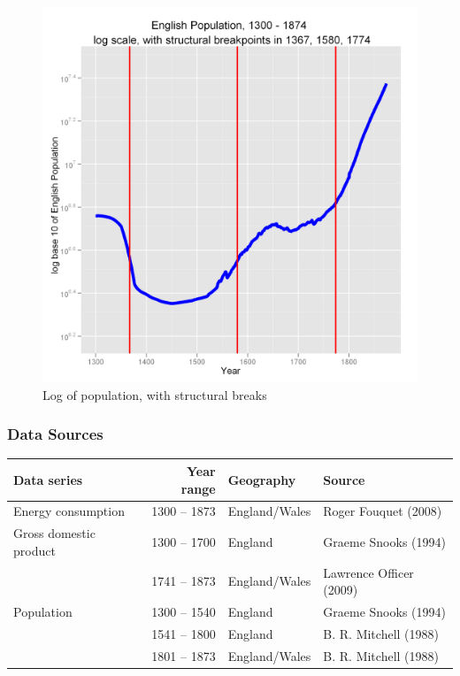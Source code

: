 \documentclass[final]{beamer}
\begin{document}
\begin{frame}
\begin{figure}[p!]
\center
\caption{Log of population, with structural breaks}
\label{fig:popLog}
\includegraphics[height=0.8\textheight]{popLog}
\end{figure}
\end{frame}

\begin{frame}
\frametitle{Data Sources}
\footnotesize{
\begin{table}[p!]
\label{tbl:dataSources}
\begin{tabular}{lrll}
Data series&Year range&Geography&Source\\
\hline
Energy consumption&1300 -- 1873&England/Wales&Roger Fouquet (2008)\\
\hline
Gross domestic product&1300 -- 1700&England&Graeme Snooks (1994)\\
&1741 -- 1873&England/Wales&Lawrence Officer (2009)\\
\hline
Population&1300 -- 1540&England&Graeme Snooks (1994)\\
&1541 -- 1800&England&B. R. Mitchell (1988)\\
&1801 -- 1873&England/Wales&B. R. Mitchell (1988)\\
\end{tabular}
\end{table}
}
\end{frame}
\end{document}
